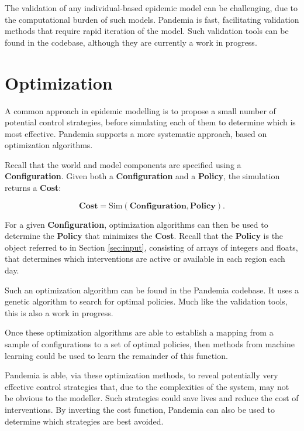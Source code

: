 \documentclass[10pt,letterpaper]{article}
\begin{document}
The validation of any individual-based epidemic model can be challenging, due to the computational burden of such models. Pandemia is fast, facilitating validation methods that require rapid iteration of the model. Such validation tools can be found in the codebase, although they are currently a work in progress.

\section{Optimization}

A common approach in epidemic modelling is to propose a small number of potential control strategies, before simulating each of them to determine which is most effective. Pandemia supports a more systematic approach, based on optimization algorithms.

Recall that the world and model components are specified using a \textbf{Configuration}. Given both a \textbf{Configuration} and a \textbf{Policy}, the simulation returns a \textbf{Cost}:

$$\textbf{Cost} = \text{Sim}(\textbf{Configuration}, \textbf{Policy}).$$

For a given \textbf{Configuration}, optimization algorithms can then be used to determine the \textbf{Policy} that minimizes the \textbf{Cost}. Recall that the \textbf{Policy} is the object referred to in Section \ref{sec:input}, consisting of arrays of integers and floats, that determines which interventions are active or available in each region each day.

Such an optimization algorithm can be found in the Pandemia codebase. It uses a genetic algorithm to search for optimal policies. Much like the validation tools, this is also a work in progress.

Once these optimization algorithms are able to establish a mapping from a sample of configurations to a set of optimal policies, then methods from machine learning could be used to learn the remainder of this function.

Pandemia is able, via these optimization methods, to reveal potentially very effective control strategies that, due to the complexities of the system, may not be obvious to the modeller. Such strategies could save lives and reduce the cost of interventions. By inverting the cost function, Pandemia can also be used to determine which strategies are best avoided.

% 
\end{document}
